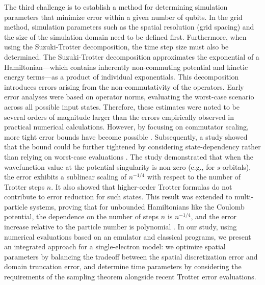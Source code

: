 \documentclass[jctc-draft.tex]{subfiles}
\begin{document}
The third challenge is to establish a method for determining simulation
parameters that minimize error within a given number of qubits. In the grid
method, simulation parameters such as the spatial resolution (grid spacing) and
the size of the simulation domain need to be defined first. Furthermore, when
using the Suzuki-Trotter decomposition, the time step size must also be
determined. The Suzuki-Trotter decomposition approximates the exponential of a
Hamiltonian---which contains inherently non-commuting potential and kinetic
energy terms---as a product of individual exponentials. This decomposition
introduces errors arising from the non-commutativity of the operators. Early
error analyses were based on operator norms, evaluating the worst-case scenario
across all possible input states. Therefore, these estimates were noted to be
several orders of magnitude larger than the errors empirically observed in
practical numerical calculations. However, by focusing on commutator scaling,
more tight error bounds have become possible
\cite{Childs2021.PhysRevX.11.011020}. Subsequently, a study showed that the bound
could be further tightened by considering state-dependency rather than relying on
worst-case evaluations \cite{Burgarth2024.PhysRevResearch.6.043155}. The study
demonstrated that when the wavefunction value at the potential
singularity is non-zero (e.g., for $s$-orbitals), the error exhibits a sublinear scaling of
$n^{-1/4}$ with respect to the number of Trotter steps $n$. It also showed that
higher-order Trotter formulas do not contribute to error reduction for such
states. This result was extended to multi-particle systems, proving that for
unbounded Hamiltonians like the Coulomb potential, the dependence on the number
of steps $n$ is $n^{-1/4}$, and the error increase relative to the particle
number is polynomial \cite{fang2026trotter}. In our study, using numerical
evaluations based on an emulator and classical programs, we present an
integrated approach for a single-electron model: we optimize spatial parameters
by balancing the tradeoff between the spatial discretization error and domain
truncation error, and determine time parameters by considering the
requirements of the sampling theorem alongside recent Trotter error evaluations.
\end{document}
